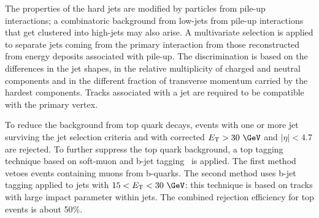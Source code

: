 The properties of the hard jets are modified by particles from pile-up interactions;
a combinatoric background from low-\pt jets from pile-up interactions that get 
clustered into high-\pt jets may also arise.
A multivariate selection is applied to separate jets coming from the 
primary interaction from those reconstructed from energy deposits associated with 
pile-up. The discrimination is based on the differences in the jet shapes,
in the relative multiplicity of charged and neutral components and in the different 
fraction of transverse momentum carried by the hardest components.
Tracks associated with a jet are required to be compatible with the primary vertex.

To reduce the background from top quark decays, events with one or more jet
surviving the jet selection criteria and with corrected $\Et > 30~\GeV$ and
$|\eta|< 4.7$ are rejected. To further suppress the top quark background, a
top tagging technique based on soft-muon and b-jet
tagging~\cite{btag1,btag2} is applied. The first method vetoes events containing
muons from b-quarks. The second method uses b-jet tagging applied to jets with
$15 < \Et < 30~\GeV$: this technique is based on tracks with large impact parameter within
jets. The combined rejection efficiency for top events is about 50\%.

